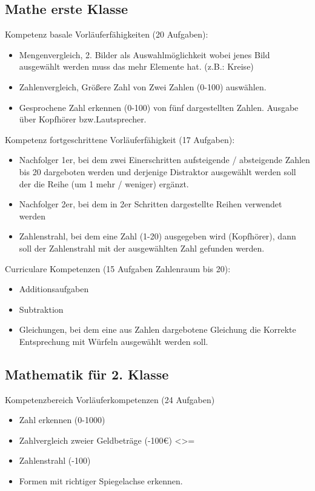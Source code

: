 \documentclass[12pt]{article}
\theoremstyle{definition}
\begin{document}
\subsection{Mathe erste Klasse}
Kompetenz basale Vorläuferfähigkeiten (20 Aufgaben):
\begin{itemize}
    \item Mengenvergleich, 2. Bilder als Auswahlmöglichkeit wobei jenes Bild ausgewählt werden muss das mehr Elemente hat. (z.B.: Kreise)
    \item Zahlenvergleich, Größere Zahl von Zwei Zahlen (0-100) auswählen.
    \item Gesprochene Zahl erkennen (0-100) von fünf dargestellten Zahlen. Ausgabe über Kopfhörer bzw.Lautsprecher.

\end{itemize}

Kompetenz fortgeschrittene Vorläuferfähigkeit (17 Aufgaben):
\begin{itemize}
    \item Nachfolger 1er, bei dem zwei Einerschritten aufsteigende / absteigende Zahlen bis 20 dargeboten werden und derjenige Distraktor ausgewählt werden soll der die Reihe (um 1 mehr / weniger) ergänzt.


    \item Nachfolger 2er, bei dem in 2er Schritten dargestellte Reihen verwendet werden
    \item Zahlenstrahl, bei dem eine Zahl (1-20) ausgegeben wird (Kopfhörer), dann soll der Zahlenstrahl mit der ausgewählten Zahl gefunden werden.
\end{itemize}
  Curriculare Kompetenzen (15 Aufgaben Zahlenraum bis 20):
\begin{itemize}
    \item Additionsaufgaben
    \item Subtraktion
  \item Gleichungen, bei dem eine aus Zahlen dargebotene Gleichung die Korrekte Entsprechung mit Würfeln ausgewählt werden soll.
\end{itemize}

\subsection{	Mathematik für 2. Klasse}
Kompetenzbereich Vorläuferkompetenzen (24 Aufgaben)
\begin{itemize}
    \item Zahl erkennen (0-1000)
    \item Zahlvergleich zweier Geldbeträge (-100€) <>= 
    \item Zahlenstrahl (-100)
    \item Formen mit richtiger Spiegelachse erkennen.
\end{itemize}
\end{document}

